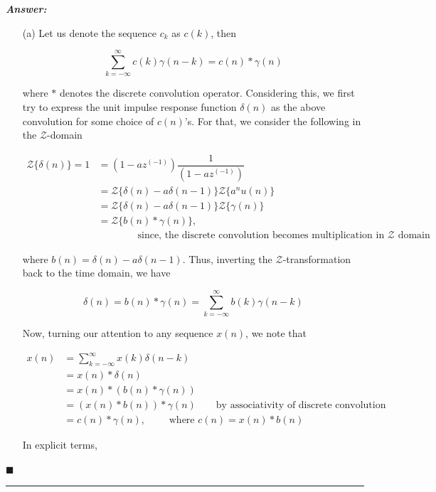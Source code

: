 \documentclass[12pt]{article}
\theoremstyle{definition}
\newenvironment{answer}{
    \textbf{\textit{Answer:}} \qquad
}{\hfill $\blacksquare$ \\ 

\begin{center}
    \rule{0.8\linewidth}{1.5px} 
    \vspace*{1cm}   
\end{center}
}
\newcommand{\zcal}{\mathcal{Z}}
\newcommand{\inv}[1][1]{^{(- #1)}}
\begin{document}
\begin{answer}
    \begin{enumerate}
        \item[(a)] Let us denote the sequence $c_k$ as $c(k)$, then
        
        $$
        \sum_{k = -\infty}^{\infty} c(k)\gamma(n-k) = c(n) \ast \gamma(n)
        $$

        where $\ast$ denotes the discrete convolution operator. Considering this, we first try to express the unit impulse response function $\delta(n)$ as the above convolution for some choice of $c(n)$'s. For that, we consider the following in the $\zcal$-domain

        \begin{align*}
            \zcal\{ \delta(n) \}
            = 1
            & = (1 - az\inv) \dfrac{1}{(1 - az\inv)}\\
            & = \zcal\{ \delta(n) - a \delta(n-1) \} \zcal\{ a^n u(n) \}\\
            & = \zcal\{ \delta(n) - a \delta(n-1) \} \zcal\{ \gamma(n) \}\\
            & = \zcal\{ b(n) \ast \gamma(n) \}, \\
            & \qquad \qquad \text{since, the discrete convolution becomes multiplication in } \zcal \text{ domain}
        \end{align*}

        where $b(n) = \delta(n) - a\delta(n-1)$. Thus, inverting the $\zcal$-transformation back to the time domain, we have 
        
        $$
        \delta(n) = b(n) \ast \gamma(n) = \sum_{k = -\infty}^{\infty} b(k) \gamma(n-k)
        $$

        Now, turning our attention to any sequence $x(n)$, we note that 

        \begin{align*}
            x(n)
            & = \sum_{k = -\infty}^{\infty} x(k) \delta(n-k)\\
            & = x(n) \ast \delta(n)\\
            & = x(n) \ast (b(n) \ast \gamma(n))\\
            & = (x(n) \ast b(n)) \ast \gamma(n) \qquad \text{by associativity of discrete convolution}\\
            & = c(n) \ast \gamma(n), \qquad \text{ where } c(n) = x(n) \ast b(n)
        \end{align*}

        In explicit terms,


\end{enumerate}
\end{answer}
\end{document}
